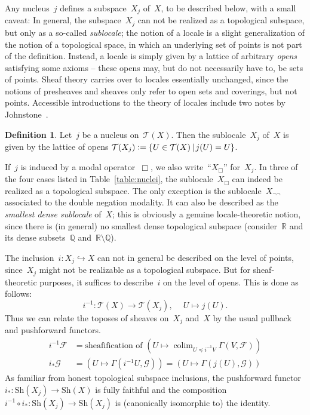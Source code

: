 \documentclass[10pt,reqno,a4paper]{amsbook}
\theoremstyle{definition}
\newtheorem{defn}{Definition}[section]
\theoremstyle{plain}
\theoremstyle{remark}
\newcommand{\F}{\mathcal{F}}
\renewcommand{\G}{\mathcal{G}}
\newcommand{\T}{\mathcal{T}}
\newcommand{\RR}{\mathbb{R}}
\newcommand{\QQ}{\mathbb{Q}}
\newcommand{\Sh}{\mathrm{Sh}}
\DeclareMathOperator{\colim}{colim}
\newcommand{\Open}{\T}
\newcommand{\?}{\,{:}\,}
\renewcommand{\_}{\mathpunct{.}\,}
\newcommand{\lra}{\longrightarrow}
\newcommand{\defeq}{\vcentcolon=}
\begin{document}
Any nucleus~$j$ defines a subspace~$X_j$ of~$X$, to be described below, with a small caveat: In
general, the subspace~$X_j$ can not be realized as a topological subspace, but
only as a so-called \emph{sublocale}; the notion of a locale is a slight
generalization of the notion of a topological space, in which an underlying set
of points is not part of the definition. Instead, a locale is simply given by a
lattice of arbitrary \emph{opens} satisfying some axioms -- these opens may, but do not necessarily have to,
be sets of points. Sheaf theory carries over to locales essentially unchanged,
since the notions of presheaves and sheaves only refer to open sets and coverings,
but not points.
Accessible introductions to the theory of locales include two notes by
Johnstone~\cite{johnstone:art,johnstone:point}.

\begin{defn}\label{defn:subspace-by-nucleus}Let~$j$ be a nucleus on~$\Open(X)$.
Then the sublocale~$X_j$ of~$X$ is given by the lattice of opens
$\Open(X_j) \defeq \{ U \in \Open(X) \,|\, j(U) = U \}$.
\end{defn}
If~$j$ is induced by a modal operator~$\Box$, we also write~``$X_\Box$''
for~$X_j$. In three of the four cases listed in Table~\ref{table:nuclei}, the
sublocale~$X_\Box$ can indeed be realized as a topological subspace. The only
exception is the sublocale~$X_{\neg\neg}$ associated to the double negation
modality. It can also be described as the \emph{smallest dense sublocale}
of~$X$; this is obviously a genuine locale-theoretic notion, since there
is (in general) no smallest dense topological subspace
(consider~$\RR$ and its dense subsets~$\QQ$ and~$\RR \setminus \QQ$).

The inclusion~$i : X_j \hookrightarrow X$ can not in general be described on the
level of points, since~$X_j$ might not be realizable as a topological subspace.
But for sheaf-theoretic purposes, it suffices to describe~$i$ on the level of
opens. This is done as follows:
\[ i^{-1} : \Open(X) \lra \Open(X_j),\ \quad U \longmapsto j(U). \]
Thus we can relate the toposes of sheaves on~$X_j$ and~$X$ by the usual
pullback and pushforward functors.
\begin{align*}
  i^{-1} \F &= \text{sheafification of $(U \mapsto \colim_{U \preceq i^{-1}V} \Gamma(V,\F))$} \\
  i_* \G &= (U \mapsto \Gamma(i^{-1}U, \G)) = (U \mapsto \Gamma(j(U), \G))
\end{align*}
As familiar from honest topological subspace inclusions, the pushforward
functor~$i_* : \Sh(X_j) \to \Sh(X)$ is fully faithful and the composition~$i^{-1}
\circ i_* : \Sh(X_j) \to \Sh(X_j)$ is (canonically isomorphic to) the identity.
\end{document}
